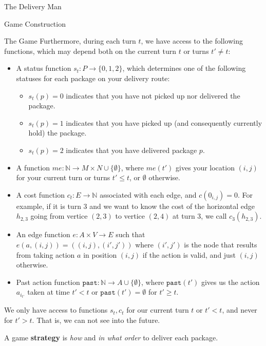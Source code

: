 \begin{section}{The Delivery Man}
\begin{subsection}{Game Construction}
\begin{subsubsection}{The Game}
      Furthermore, during each turn $t$, we have access to the following functions, which may depend both on the current turn $t$ or turns $t' \neq t$:
      \begin{itemize}
      \item A status function $s_t: P \rightarrow \{0,1,2 \}$, which determines one of the following statuses for each package on your delivery route:
        \begin{itemize}
        \item $s_t(p) = 0$ indicates that you have not picked up nor delivered the package.
        \item $s_t(p) = 1$ indicates that you have picked up (and consequently currently hold) the package.
          
        \item $s_t(p) = 2$ indicates that you have delivered package $p$.
        \end{itemize}

      \item A function $me: \mathbb{N} \rightarrow M\times N \cup \{\emptyset \}$, where $me(t')$ gives your location $(i, j)$ for your current turn or turns $t' \leq t$, or $\emptyset$ otherwise.

      \item A cost function $c_t: E \rightarrow \mathbb{N}$ associated with each edge, and $c(0_{i,j}) = 0$. For example, if it is turn $3$ and we want to know the cost of the horizontal edge $h_{2,3}$ going from vertice $(2, 3)$ to vertice $(2, 4)$ at turn $3$, we call $c_3(h_{2,3})$.

      \item An edge function $e: A\times V \rightarrow E$ such that $e(a, (i,j)) = ((i, j),(i',j'))$ where $(i', j')$ is the node that results from taking action $a$ in position $(i,j)$ if the action is valid, and just $(i, j)$ otherwise.

      \item Past action function $\texttt{past}: \mathbb{N} \rightarrow A\cup \{\emptyset\}$, where $\texttt{past}(t')$ gives us the action $a_{i_{t'}}$ taken at time $t' < t$ or $\texttt{past}(t') = \emptyset$ for $t' \geq t$.
      \end{itemize}

      We only have access to functions $s_t, c_t$ for our current turn $t$ or $t' < t$, and never for $t' > t$. That is, we can not see into the future.
      
      A game \textbf{strategy} is \textit{how} and \textit{in what order} to deliver each package.


\end{subsubsection}
\end{subsection}
\end{section}
